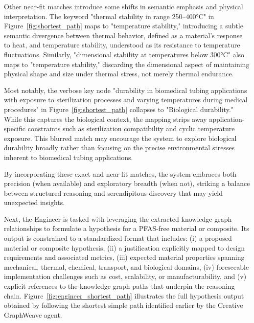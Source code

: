 Other near-fit matches introduce some shifts in semantic emphasis and physical interpretation. The keyword "thermal stability in range 250–400°C" in Figure~\ref{fig:shortest_path} maps to "temperature stability," introducing a subtle semantic divergence between thermal behavior, defined as a material’s response to heat, and temperature stability, understood as its resistance to temperature fluctuations. Similarly, "dimensional stability at temperatures below 300°C" also maps to "temperature stability," discarding the dimensional aspect of maintaining physical shape and size under thermal stress, not merely thermal endurance.

Most notably, the verbose key node "durability in biomedical tubing applications with exposure to sterilization processes and varying temperatures during medical procedures" in Figure~\ref{fig:shortest_path} collapses to "Biological durability." While this captures the biological context, the mapping strips away application-specific constraints such as sterilization compatibility and cyclic temperature exposure. This blurred match may encourage the system to explore biological durability broadly rather than focusing on the precise environmental stresses inherent to biomedical tubing applications. 

By incorporating these exact and near-fit matches, the system embraces both precision (when available) and exploratory breadth (when not), striking a balance between structured reasoning and serendipitous discovery that may yield unexpected insights. 

Next, the Engineer is tasked with leveraging the extracted knowledge graph relationships to formulate a hypothesis for a PFAS-free material or composite. Its output is constrained to a standardized format that includes: (i) a proposed material or composite hypothesis, (ii) a justification explicitly mapped to design requirements and associated metrics, (iii) expected material properties spanning mechanical, thermal, chemical, transport, and biological domains, (iv) foreseeable implementation challenges such as cost, scalability, or manufacturability, and (v) explicit references to the knowledge graph paths that underpin the reasoning chain. Figure~\ref{fig:engineer_shortest_path} illustrates the full hypothesis output obtained by following the shortest simple path identified earlier by the Creative GraphWeave agent.

